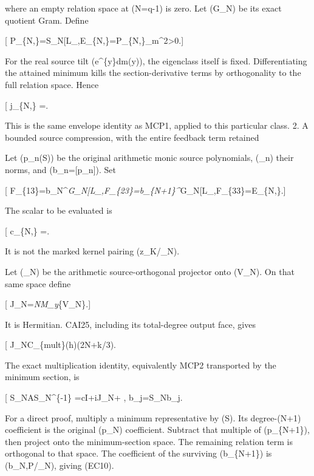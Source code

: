 where an empty relation space at (N=q-1) is zero. Let (G\_N) be its exact quotient Gram. Define

{[} P\_\{N,\lambda\}=\mathscr S\_N{[}L\_\lambda{]},\qquad E\_\{N,\lambda\}=\textbar P\_\{N,\lambda\}\textbar\_m\^{}2\textgreater0.{]}

For the real source tilt (e\^{}\{\theta y\}dm(y)), the eigenclass itself is fixed. Differentiating the attained minimum kills the section-derivative terms by orthogonality to the full relation space. Hence

{[} j\_\{N,\lambda\} =. \tag{EC7}{]}

This is the same envelope identity as MCP1, applied to this particular class. 2. A bounded source compression, with the entire feedback term retained

Let (p\_n(S)) be the original arithmetic monic source polynomials, (\omega\_n) their norms, and (b\_n={[}p\_n{]}). Set

{[} F\_\{13\}=b\_N\^{}\emph{G\_N{[}L\_\lambda{]},\quad F\_\{23\}=b\_\{N+1\}\^{}}G\_N{[}L\_\lambda{]},\quad F\_\{33\}=E\_\{N,\lambda\}.{]}

The scalar to be evaluated is

{[} \mathfrak c\_\{N,\lambda\} =. \tag{EC8}{]}

It is not the marked kernel pairing (z\_K/\omega\_N).

Let (\Pi\_N) be the arithmetic source-orthogonal projector onto (\mathcal V\_N). On that same space define

{[} \mathsf J\_N=\Pi\emph{NM\_y\textbar{}}\{\mathcal V\_N\}.{]}

It is Hermitian. CAI25, including its total-degree output face, gives

{[} \textbar{}\mathsf J\_N\textbar{}\le C\_\{\rm mult\}(h)(2N+\lfloor k/3\rfloor). \tag{EC9}{]}

The exact multiplication identity, equivalently MCP2 transported by the minimum section, is

{[} \mathscr S\_NA\mathscr S\_N\^{}\{-1\} =cI+i\mathsf J\_N+ , \qquad \widehat b\_j=\mathscr S\_Nb\_j. \tag{EC10}{]}

For a direct proof, multiply a minimum representative by (S). Its degree-(N+1) coefficient is the original (p\_N) coefficient. Subtract that multiple of (p\_\{N+1\}), then project onto the minimum-section space. The remaining relation term is orthogonal to that space. The coefficient of the surviving (\widehat b\_\{N+1\}) is (\langle\widehat b\_N,P\rangle/\omega\_N), giving (EC10).

